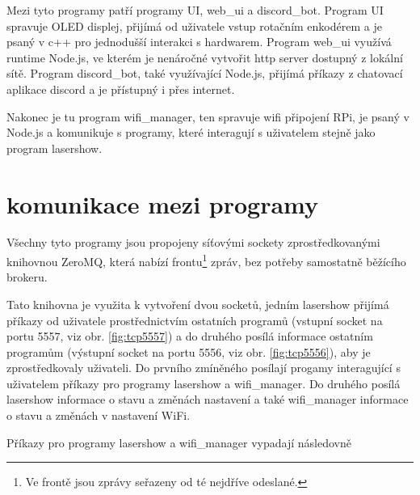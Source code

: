 \documentclass{template/socthesis}
\begin{document}
Mezi tyto programy patří programy UI, web\_ui a discord\_bot. Program UI spravuje OLED displej, přijímá od uživatele vstup rotačním enkodérem a je psaný v c++ pro jednodušší interakci s hardwarem. Program web\_ui využívá runtime Node.js, ve kterém je nenáročné vytvořit http server dostupný z lokální sítě.  Program discord\_bot, také využívající Node.js, přijímá příkazy z chatovací aplikace discord a je přístupný i přes internet.

Nakonec je tu program wifi\_manager, ten spravuje wifi připojení RPi, je psaný v Node.js a komunikuje s programy, které interagují s uživatelem stejně jako program lasershow.

\section{komunikace mezi programy} \label{comms}
Všechny tyto programy jsou propojeny síťovými sockety zprostředkovanými knihovnou ZeroMQ, která nabízí frontu\footnote{Ve frontě jsou zprávy seřazeny od té nejdříve odeslané.} zpráv, bez potřeby samostatně běžícího brokeru.

Tato knihovna je využita k vytvoření dvou socketů, jedním lasershow přijímá příkazy od uživatele prostřednictvím ostatních programů (vstupní socket na portu 5557, viz obr. \ref{fig:tcp5557}) a do druhého posílá informace ostatním programům (výstupní socket na portu 5556, viz obr. \ref{fig:tcp5556}), aby je zprostředkovaly uživateli. Do prvního zmíněného posílají progamy interagující s uživatelem příkazy pro programy lasershow a wifi\_manager. Do druhého posílá lasershow informace o stavu a změnách nastavení  a také wifi\_manager informace o stavu a změnách v nastavení WiFi.

Příkazy pro programy lasershow a wifi\_manager vypadají následovně
\end{document}
